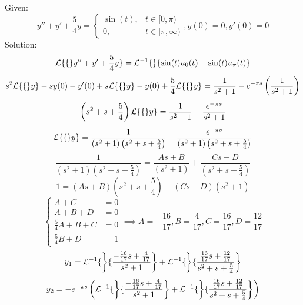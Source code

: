 \documentclass[diffeq.tex]{subfiles}
\begin{document}
\np
\begin{homework*}[268.6]
    Given:
    \begin{equation}
        y'' + y' + \frac{5}{4}y = \begin{cases}
            \sin(t), &t\in[0,\pi)\\
            0, &t\in[\pi,\infty)
        \end{cases}, y(0) = 0, y'(0) = 0
    \end{equation}
    Solution:
    \begin{equation}
        \mathcal{L}\{\{\}y'' + y' + \frac{5}{4}y\} = \mathcal{L}^{-1}\{\left\}\{\sin(t)u_{0}(t) - \sin(t)u_{\pi}(t)\right\}
    \end{equation}
    \begin{equation}
        s^{2}\mathcal{L}\{\{\}y\} - sy(0) - y'(0) + s\mathcal{L}\{\{\}y\} - y(0) + \frac{5}{4}\mathcal{L}\{\{\}y\} = \frac{1}{s^{2} + 1} - e^{-\pi s}\left(\frac{1}{s^{2} + 1}\right)
    \end{equation}
    \begin{equation}
        \left(s^{2} + s + \frac{5}{4}\right)\mathcal{L}\{\{\}y\} = \frac{1}{s^{2} + 1} - \frac{e^{-\pi s}}{s^{2} + 1}
    \end{equation}
    \begin{equation}
        \mathcal{L}\{\{\}y\} = \frac{1}{(s^{2} + 1)\left(s^{2} + s + \frac{5}{4}\right)} - \frac{e^{-\pi s}}{(s^{2} + 1)\left(s^{2} + s + \frac{5}{4}\right)}
    \end{equation}
    \begin{equation}
        \frac{1}{(s^{2} + 1)\left(s^{2} + s + \frac{5}{4}\right)} = \frac{As + B}{(s^{2} + 1)} + \frac{Cs + D}{\left(s^{2} + s + \frac{5}{4}\right)}
    \end{equation}
    \begin{equation}
        1 = (As + B)\left(s^{2} + s + \frac{5}{4}\right) + (Cs + D)(s^{2} + 1)
    \end{equation}
    \begin{equation}
        \begin{cases}
            A + C &= 0\\
            A + B + D &= 0\\
            \frac{5}{4}A + B + C &= 0\\
            \frac{5}{4}B + D &= 1
        \end{cases}
        \implies A = -\frac{16}{17}, B = \frac{4}{17}, C = \frac{16}{17}, D = \frac{12}{17}
    \end{equation}
    \begin{equation}
        y_{1} = \mathcal{L}^{-1}\{\left\}\{\frac{-\frac{16}{17}s + \frac{4}{17}}{s^{2} + 1}\right\} + \mathcal{L}^{-1}\{\left\}\{\frac{\frac{16}{17}s + \frac{12}{17}}{s^{2} + s + \frac{5}{4}}\right\}
    \end{equation}
    \begin{equation}
        y_{2} = -e^{-\pi s}\left(\mathcal{L}^{-1}\{\left\}\{\frac{-\frac{16}{17}s + \frac{4}{17}}{s^{2} + 1}\right\} + \mathcal{L}^{-1}\{\left\}\{\frac{\frac{16}{17}s + \frac{12}{17}}{s^{2} + s + \frac{5}{4}}\right\}\right)
    \end{equation}
\end{homework*}
\np
\end{document}
